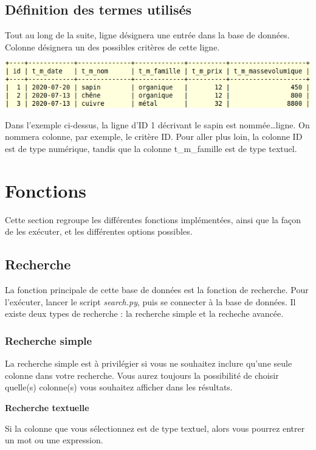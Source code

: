 \documentclass[12pt,a4paper]{article}
\begin{document}
\subsection{Définition des termes utilisés}
    Tout au long de la suite, ligne désignera une entrée dans la base de données.
    Colonne désignera un des possibles critères de cette ligne.
    
    \includegraphics{exemple_lignes_colonnes.png}

    Dans l'exemple ci-dessus, la ligne d'ID 1 décrivant le sapin est nommée\dots ligne.
    On nommera colonne, par exemple, le critère ID. Pour aller plus loin, la colonne ID
    est de type numérique, tandis que la colonne t\_m\_famille est de type textuel.



\bigskip
\section{Fonctions}

Cette section regroupe les différentes fonctions implémentées, ainsi que la façon de les exécuter, et les différentes options possibles.


\subsection{Recherche}

    La fonction principale de cette base de données est la fonction de recherche.
    Pour l'exécuter, lancer le script \emph{search.py}, puis se connecter à la base de données.
    Il existe deux types de recherche : la recherche simple et la recheche avancée.

    \subsubsection{Recherche simple}
        La recherche simple est à privilégier si vous ne souhaitez inclure qu'une seule colonne dans votre recherche.
        Vous aurez toujours la possibilité de choisir quelle(s) colonne(s) vous souhaitez afficher dans les résultats.


        \medskip
        \textbf{Recherche textuelle}

        Si la colonne que vous sélectionnez est de type textuel, alors vous pourrez entrer un mot ou une expression.
        
\end{document}
